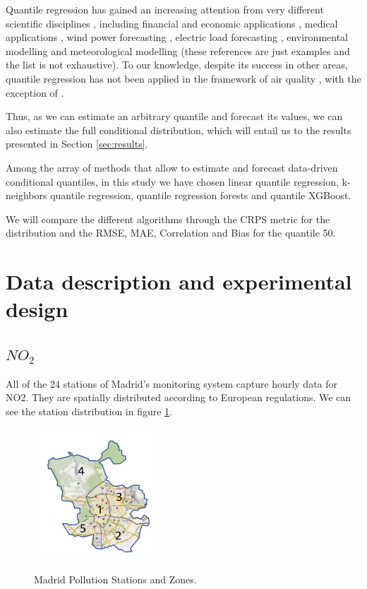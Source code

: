 \documentclass[a4paper,twocolumn,5p]{elsarticle}
\begin{document}
Quantile regression has gained an increasing attention from very
different scientific disciplines \cite{yu_quantile_2003}, including
financial and economic applications \cite{ben_rejeb_financial_2016},
medical applications \cite{jang_quantile_2018}, wind power
forecasting \cite{wan_direct_2017}, electric load forecasting
\cite{lebotsa_short_2018}, environmental modelling
\cite{cade_gentle_2003} and meteorological modelling
\cite{baur_modelling_2004} (these references are just
examples and the list is not exhaustive). To our knowledge, despite
its success in other areas, quantile regression has not been applied
in the framework of air quality , with the exception of
 \cite{martinezsilva_forecasting_2016}.

Thus, as we can estimate an arbitrary quantile and forecast its
values, we can also estimate the full conditional distribution, which
will entail us to the results presented in Section \ref{sec:results}.

Among the array of methods that allow to estimate and forecast
data-driven conditional quantiles, in this study we have chosen
linear quantile regression,
k-neighbors quantile regression, quantile regression forests and quantile XGBoost. 

We will compare the different algorithms through the CRPS metric for the 
distribution and the RMSE, MAE, Correlation and Bias for the quantile 50.

\section{Data description and experimental design}

\subsection{$NO_2$}
\label{sec:no2}
All of the 24 stations of Madrid’s monitoring system capture hourly data for NO2. 
They are spatially distributed according to European regulations.
We can see the station distribution in figure \ref{figure:stations}.

\begin{figure}
  \centering
      \includegraphics[width=0.4\textwidth]{zonas_madrid}
      \label{figure:stations}
  \caption{Madrid Pollution Stations and Zones.}
\end{figure} 
\end{document}
